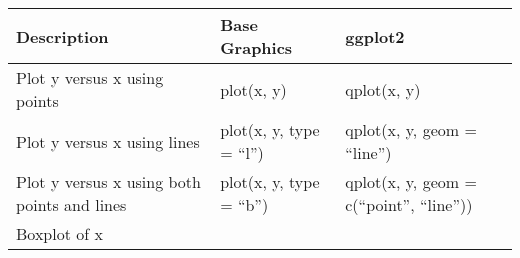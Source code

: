 \documentclass[]{article}
\begin{document}
\begin{longtable}[]{@{}lll@{}}
\toprule
\begin{minipage}[b]{0.41\columnwidth}\raggedright\strut
Description\strut
\end{minipage} & \begin{minipage}[b]{0.25\columnwidth}\raggedright\strut
Base Graphics\strut
\end{minipage} & \begin{minipage}[b]{0.25\columnwidth}\raggedright\strut
ggplot2\strut
\end{minipage}\tabularnewline
\midrule
\endhead
\begin{minipage}[t]{0.41\columnwidth}\raggedright\strut
Plot y versus x using points\strut
\end{minipage} & \begin{minipage}[t]{0.25\columnwidth}\raggedright\strut
plot(x, y)\strut
\end{minipage} & \begin{minipage}[t]{0.25\columnwidth}\raggedright\strut
qplot(x, y)\strut
\end{minipage}\tabularnewline
\begin{minipage}[t]{0.41\columnwidth}\raggedright\strut
Plot y versus x using lines\strut
\end{minipage} & \begin{minipage}[t]{0.25\columnwidth}\raggedright\strut
plot(x, y, type = ``l'')\strut
\end{minipage} & \begin{minipage}[t]{0.25\columnwidth}\raggedright\strut
qplot(x, y, geom = ``line'')\strut
\end{minipage}\tabularnewline
\begin{minipage}[t]{0.41\columnwidth}\raggedright\strut
Plot y versus x using both points and lines\strut
\end{minipage} & \begin{minipage}[t]{0.25\columnwidth}\raggedright\strut
plot(x, y, type = ``b'')\strut
\end{minipage} & \begin{minipage}[t]{0.25\columnwidth}\raggedright\strut
qplot(x, y, geom = c(``point'', ``line''))\strut
\end{minipage}\tabularnewline
\begin{minipage}[t]{0.41\columnwidth}\raggedright\strut
Boxplot of x\strut
\end{minipage} & \begin{minipage}[t]{0.25\columnwidth}\raggedright\strut

\end{minipage}
\end{longtable}
\end{document}
